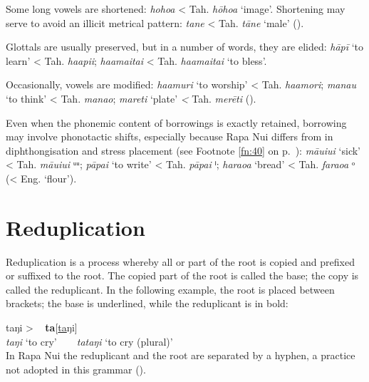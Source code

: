 Some long vowels are shortened: \textit{hoho{\ꞌ}a} {\textless} Tah. \textit{hōho{\ꞌ}a} ‘image’. Shortening may serve to avoid an illicit metrical pattern: \textit{tane} {\textless} Tah. \textit{tāne} ‘male’ ().

Glottals are usually preserved, but in a number of words, they are elided: \textit{hāpī} ‘to learn’ {\textless} Tah. \textit{ha{\ꞌ}api{\ꞌ}i}; \textit{ha{\ꞌ}amaitai} {\textless} Tah. \textit{ha{\ꞌ}amaita{\ꞌ}i} ‘to bless’. 

Occasionally, vowels are modified: \textit{ha{\ꞌ}amuri} ‘to worship’ {\textless} Tah. \textit{ha{\ꞌ}amori}; \textit{mana{\ꞌ}u} ‘to think’ {\textless} Tah. \textit{mana{\ꞌ}o}; \textit{mareti} ‘plate’ \textit{{\textless}} Tah. \textit{merēti} (). 

Even when the phonemic content of  borrowings is exactly retained, borrowing may involve phonotactic shifts, especially because Rapa Nui differs from  in diphthongisation and stress placement (see Footnote \ref{fn:40} on p.~\pageref{fn:40}): \textit{māuiui} \textstyleIPA{[ˌmaːuiˈui]} ‘sick’ {\textless} Tah. \textit{māuiui} \textstyleIPA{[ˈmaː}ᵘᵘ\textstyleIPA{i]}; \textit{pāpa{\ꞌ}i} \textstyleIPA{[ˌpaːˈpaɁi]} ‘to write’ {\textless} Tah. \textit{pāpa{\ꞌ}i} \textstyleIPA{[ˈpaːpɁa}ⁱ\textstyleIPA{]}; \textit{haraoa} \textstyleIPA{[ˌharaˈoa]} ‘bread’ {\textless} Tah. \textit{faraoa} \textstyleIPA{[faˈra(ː)}ᵒ\textstyleIPA{a]} ({\textless} Eng. ‘flour’).

\section{Reduplication}\label{sec:2.6}
Reduplication is a process whereby all or part of the root is copied and prefixed or suffixed to the root. The copied part of the root is called the base; the copy is called the reduplicant. In the following example, the root is placed between brackets; the base is underlined, while the reduplicant is in bold:

\ea
\gll  \textup{taŋi}      \textup{>} ~ \textup{\textbf{ta}[\underline{ta}ŋi]}\\
  {\textit{taŋi} ‘to cry’} ~ ~  {\textit{tataŋi} ‘to cry (plural)’}\\
\z
In Rapa Nui  the reduplicant and the root are separated by a hyphen, a practice not adopted in this grammar ().

